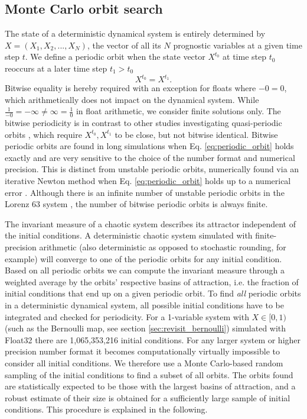 \subsection{Monte Carlo orbit search}
\label{sec:orbit_search}

The state of a deterministic dynamical system is entirely determined by $X = (X_1,X_2,...,X_N)$, the vector of all its $N$
prognostic variables at a given time step $t$. We define a periodic orbit when the state vector $X^{t_0}$ at time step $t_0$
reoccurs at a later time step $t_1 > t_0$
\begin{equation}
	X^{t_0} = X^{t_1}.
	\label{eq:periodic_orbit}
\end{equation}
Bitwise equality is hereby required with an exception for floats where $-0 = 0$, which arithmetically does not impact on the
dynamical system. While $\tfrac{1}{-0} = -\infty \neq \infty = \tfrac{1}{0}$ in float arithmetic, we consider finite solutions only.
The bitwise periodicity is in contrast to other studies investigating quasi-periodic orbits \citep{Urminsky2010,Yalniz2021},
which require $X^{t_0}, X^{t_1}$ to be close, but not bitwise identical. Bitwise periodic orbits are found in long simulations
when Eq. \ref{eq:periodic_orbit} holds exactly and are very sensitive to the choice of the number format and numerical
precision. This is distinct from unstable periodic orbits, numerically found via an iterative Newton method when
Eq. \ref{eq:periodic_orbit} holds up to a numerical error \citep{Viswanath2007}. Although there is an infinite number of unstable
periodic orbits in the Lorenz 63 system \citep{Capinski2018,Lorenz1963}, the number of bitwise periodic orbits is always finite.

The invariant measure of a chaotic system describes its attractor independent of the initial conditions. A deterministic chaotic
system simulated with finite-precision arithmetic (also deterministic as opposed to stochastic rounding, for example) will converge
to one of the periodic orbits for any initial condition. Based on all periodic orbits we can compute the invariant measure through
a weighted average by the orbits’ respective basins of attraction, i.e. the fraction of initial conditions that end up on a given
periodic orbit. To find \emph{all} periodic orbits in a deterministic dynamical system, all possible initial conditions have to be
integrated and checked for periodicity. For a 1-variable system with $X \in [0,1)$ (such as the Bernoulli map, see section
\ref{sec:revisit_bernoulli}) simulated with Float32 there are 1,065,353,216 initial conditions. For any larger system or
higher precision number format it becomes computationally virtually impossible to consider all initial conditions. We therefore
use a Monte Carlo-based random sampling of the initial conditions to find a subset of all orbits. The orbits found are statistically
expected to be those with the largest basins of attraction, and a robust estimate of their size is obtained for a sufficiently large
sample of initial conditions. This procedure is explained in the following.

